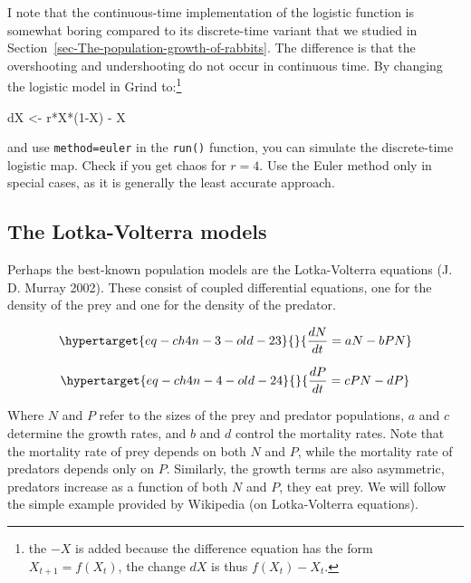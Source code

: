 \documentclass[
  a4paper,
  DIV=11,
  numbers=noendperiod,
  oneside]{scrreprt}
\newenvironment{Shaded}{\begin{snugshade}}{\end{snugshade}}
\newcommand{\DecValTok}[1]{\textcolor[rgb]{0.68,0.00,0.00}{#1}}
\newcommand{\NormalTok}[1]{\textcolor[rgb]{0.00,0.23,0.31}{#1}}
\newcommand{\OtherTok}[1]{\textcolor[rgb]{0.00,0.23,0.31}{#1}}
\newcommand{\SpecialCharTok}[1]{\textcolor[rgb]{0.37,0.37,0.37}{#1}}
\begin{document}
I note that the continuous-time implementation of the logistic function
is somewhat boring compared to its discrete-time variant that we studied
in Section~\ref{sec-The-population-growth-of-rabbits}. The difference is
that the overshooting and undershooting do not occur in continuous time.
By changing the logistic model in Grind to:\footnote{the \(-X\) is added
  because the difference equation has the form \(X_{t + 1} = f(X_{t})\),
  the change \(dX\) is thus \(f(X_{t})-X_{t}\).}

\begin{Shaded}
\begin{Highlighting}[]
\NormalTok{dX }\OtherTok{\textless{}{-}}\NormalTok{ r}\SpecialCharTok{*}\NormalTok{X}\SpecialCharTok{*}\NormalTok{(}\DecValTok{1}\SpecialCharTok{{-}}\NormalTok{X) }\SpecialCharTok{{-}}\NormalTok{ X }
\end{Highlighting}
\end{Shaded}

and use \texttt{method=\textquotesingle{}euler\textquotesingle{}} in the
\texttt{run()} function, you can simulate the discrete-time logistic
map. Check if you get chaos for \(r = 4\). Use the Euler method only in
special cases, as it is generally the least accurate approach.

\hypertarget{sec-The-LotkaVolterra-models}{%
\subsection{The Lotka-Volterra
models}\label{sec-The-LotkaVolterra-models}}

Perhaps the best-known population models are the Lotka-Volterra
equations (J. D. Murray 2002). These consist of coupled differential
equations, one for the density of the prey and one for the density of
the predator.

\begin{equation}\protect\hypertarget{eq-ch4n-3-old-23}{}{
\frac{dN}{dt} = aN - bPN
}\label{eq-ch4n-3-old-23}\end{equation}

\begin{equation}\protect\hypertarget{eq-ch4n-4-old-24}{}{
\frac{dP}{dt} = cPN - dP
}\label{eq-ch4n-4-old-24}\end{equation}

Where \(N\) and \(P\) refer to the sizes of the prey and predator
populations, \(a\) and \(c\) determine the growth rates, and \(b\) and
\(d\) control the mortality rates. Note that the mortality rate of prey
depends on both \(N\) and \(P\), while the mortality rate of predators
depends only on \(P\). Similarly, the growth terms are also asymmetric,
predators increase as a function of both \(N\) and \(P\), they eat prey.
We will follow the simple example provided by Wikipedia (on
Lotka-Volterra equations).
\end{document}
